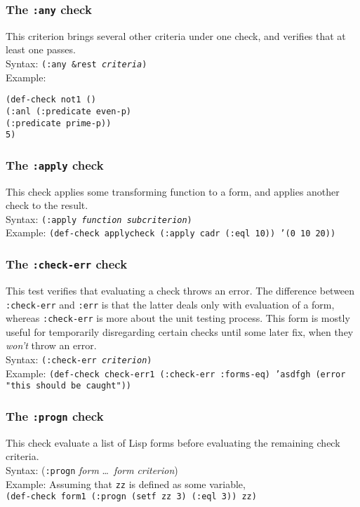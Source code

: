 \subsubsection{The \texttt{:any} check} 
This criterion brings several other criteria under one check, and
verifies that at least one passes.
\\ Syntax: \texttt{(:any \&rest \emph{criteria})}
\\ Example:
\begin{tabbing}
\texttt{(de}\=\texttt{f-}\=\texttt{check not1 ()}
\\ \>\>\texttt{(:anl }\=\texttt{(:predicate even-p)}
\\ \>\>\>\texttt{(:predicate prime-p))}
\\ \>\texttt{5)}
\end{tabbing}

\subsubsection{The \texttt{:apply} check}
This check applies some transforming function to a form, and applies
another check to the result.
\\ Syntax: \texttt{(:apply \textit{function} \textit{subcriterion})}
\\ Example: \texttt{(def-check applycheck (:apply cadr (:eql 10)) '(0 10 20))}

\subsubsection{The \texttt{:check-err} check}
This test verifies that evaluating a check throws an
error. The difference between
\texttt{:check-err} and \texttt{:err} is that the latter deals only
with evaluation of a form, whereas \texttt{:check-err} is more about
the unit testing process.  This form is mostly useful for temporarily
disregarding certain checks until some later fix, when they
\emph{won't} throw an error.
%
\\ Syntax: \texttt{(:check-err \textit{criterion})}
\\ Example: \texttt{(def-check check-err1 (:check-err :forms-eq) 'asdfgh (error "this should be caught"))}

\subsubsection{The \texttt{:progn} check}
This check evaluate a list of Lisp forms before evaluating the
remaining check criteria.
\\ Syntax: (\texttt{:progn} \textit{form} \ldots\ \textit{form} \textit{criterion})
\\ Example: Assuming that \texttt{zz} is defined as some variable,
\\ \hspace*{2em}\texttt{(def-check form1 (:progn (setf zz 3) (:eql 3)) zz)}

